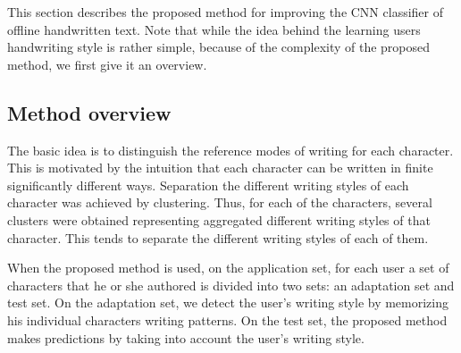 \documentclass{article}
\begin{document}
This section describes the proposed method for improving the CNN classifier of offline handwritten text. 
Note that while the idea behind the learning users handwriting style is rather simple, because of the complexity of the proposed method, we first give it an overview. 

\subsection{Method overview}

The basic idea is to distinguish the reference modes %
of writing for each character. 
This is motivated by the intuition that each character can be written in finite significantly different ways. 
Separation the different writing styles of each character was achieved by clustering. 
Thus, for each of the characters, several clusters were obtained representing aggregated different writing styles of that character. 
This tends to separate the different writing styles of each of them. 

When the proposed method is used, on the application set, for each user a set of characters that he or she authored is divided into two sets: an adaptation set and test set. 
On the adaptation set, we detect the user's writing style by memorizing his individual characters writing patterns. 
On the test set, the proposed method makes predictions by taking into account the user's writing style. 
\end{document}
